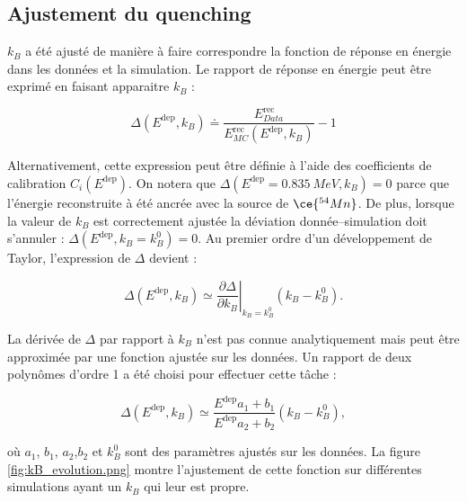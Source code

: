 \bigbreak

\subsection{Ajustement du quenching}
\label{sec:quenching}

$k_B$ a été ajusté de manière à faire correspondre la fonction de réponse en énergie dans les données et la simulation. Le rapport de réponse en énergie peut être exprimé en faisant apparaitre $k_B$ :

\begin{equation}
    \Delta\left(E^{\textrm{dep}}, k_B\right) \doteq \frac{E^{\textrm{rec}}_{Data}}{E^{\textrm{rec}}_{MC}\left(E^{\textrm{dep}}, k_B\right)} - 1
\end{equation}

Alternativement, cette expression peut être définie à l'aide des coefficients de calibration $C_i(E^\textrm{dep})$. On notera que $\Delta\left(E^{\textrm{dep}} = \SI{0.835}{MeV}, k_B\right) = 0$ parce que l'énergie reconstruite à été ancrée avec la source de $\ce{^{54}Mn}$. De plus, lorsque la valeur de $k_B$ est correctement ajustée la déviation donnée--simulation doit s'annuler :  $\Delta\left(E^{\textrm{dep}}, k_B = k_B^0\right) = 0$. Au premier ordre d'un développement de Taylor, l'expression de $\Delta$ devient :

\begin{equation}
    \Delta\left(E^{\textrm{dep}}, k_B\right) \simeq \left.\frac{\partial \Delta}{\partial k_B}\right|_{k_B = k_B^0} \left(k_B - k_B^0\right).
\end{equation}

\bigbreak

La dérivée de $\Delta$ par rapport à $k_B$ n'est pas connue analytiquement mais peut être approximée par une fonction ajustée sur les données. Un rapport de deux polynômes d'ordre 1 a été choisi pour effectuer cette tâche :

\begin{equation}
    \Delta\left(E^{\textrm{dep}}, k_B\right) \simeq \frac{E^{\textrm{dep}}a_1 + b_1}{E^{\textrm{dep}}a_2 + b_2} \left(k_B - k_B^0\right),
\end{equation}

où $a_1$, $b_1$, $a_2$,$b_2$ et $k_B^0$ sont des paramètres ajustés sur les données. La figure \ref{fig:kB_evolution.png} montre l'ajustement de cette fonction sur différentes simulations ayant un $k_B$ qui leur est propre.\\

